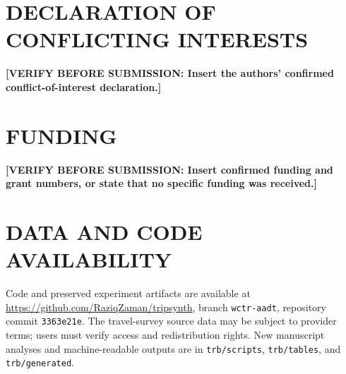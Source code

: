 \documentclass[numbered]{trbunofficial}
\begin{document}
\section*{DECLARATION OF CONFLICTING INTERESTS}
\textbf{[VERIFY BEFORE SUBMISSION: Insert the authors' confirmed conflict-of-interest declaration.]}

\section*{FUNDING}
\textbf{[VERIFY BEFORE SUBMISSION: Insert confirmed funding and grant numbers, or state that no specific funding was received.]}

\section*{DATA AND CODE AVAILABILITY}
Code and preserved experiment artifacts are available at \url{https://github.com/RaziqZaman/tripsynth}, branch \texttt{wctr-aadt}, repository commit \texttt{3363e21e}. The travel-survey source data may be subject to provider terms; users must verify access and redistribution rights. New manuscript analyses and machine-readable outputs are in \texttt{trb/scripts}, \texttt{trb/tables}, and \texttt{trb/generated}.



\end{document}
